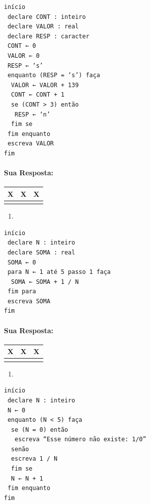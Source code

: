 \documentclass[12pt,a4paper]{article}
\begin{document}
\begin{verbatim}
início
 declare CONT : inteiro
 declare VALOR : real
 declare RESP : caracter
 CONT ← 0
 VALOR ← 0
 RESP ← ‘s’
 enquanto (RESP = ‘s’) faça
  VALOR ← VALOR + 139
  CONT ← CONT + 1
  se (CONT > 3) então
   RESP ← ‘n’
  fim se
 fim enquanto
 escreva VALOR
fim
\end{verbatim}

    \hypertarget{sua-resposta}{%
\paragraph{Sua Resposta:}\label{sua-resposta}}

\begin{longtable}[]{@{}ccc@{}}
\toprule
X & X & X\tabularnewline
\midrule
\endhead
& &\tabularnewline
\bottomrule
\end{longtable}

    \begin{enumerate}
\def\labelenumi{\alph{enumi})}
\setcounter{enumi}{6}
\item
\end{enumerate}

\begin{verbatim}
início
 declare N : inteiro
 declare SOMA : real
 SOMA ← 0
 para N ← 1 até 5 passo 1 faça
  SOMA ← SOMA + 1 / N
 fim para
 escreva SOMA
fim
\end{verbatim}

    \hypertarget{sua-resposta}{%
\paragraph{Sua Resposta:}\label{sua-resposta}}

\begin{longtable}[]{@{}ccc@{}}
\toprule
X & X & X\tabularnewline
\midrule
\endhead
& &\tabularnewline
\bottomrule
\end{longtable}

    \begin{enumerate}
\def\labelenumi{\alph{enumi})}
\setcounter{enumi}{7}
\item
\end{enumerate}

\begin{verbatim}
início
 declare N : inteiro
 N ← 0
 enquanto (N < 5) faça
  se (N = 0) então
   escreva “Esse número não existe: 1/0”
  senão
  escreva 1 / N
  fim se
  N ← N + 1
 fim enquanto
fim
\end{verbatim}
\end{document}
